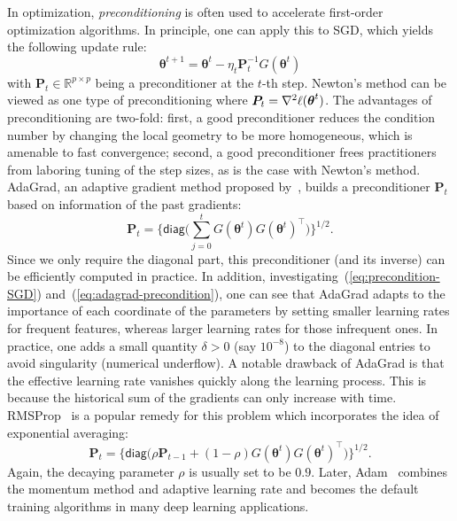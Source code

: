 In optimization, \emph{preconditioning} is often used to accelerate first-order optimization algorithms. In principle, one can apply this to SGD, which yields the following update rule:
\begin{equation}
\bm{\theta}^{t+1}=\bm{\theta}^{t}-\eta_{t}\bm{P}_{t}^{-1}G(\bm{\theta}^{t})\label{eq:precondition-SGD}
\end{equation}
with $\bm{P}_t \in \mathbb{R}^{p\times p}$ being a preconditioner at the $t$-th step. Newton's method can be viewed as one type of preconditioning where $\bm{P}_{t} = \nabla^2 \ell(\text{\boldmath $\theta$}^t)$. The advantages of preconditioning are two-fold: first, a good preconditioner reduces the condition number by changing the local geometry to be more homogeneous, which is amenable to fast convergence; second, a good preconditioner frees practitioners from laboring tuning of the step sizes, as is the case with Newton's method. AdaGrad, an adaptive gradient method proposed by~\cite{duchi2011adaptive}, builds a preconditioner $\bm{P}_{t}$ based on information of the past gradients:
\begin{equation}
\bm{P}_{t}= \Big \{ \mathsf{diag}\Big(\sum_{j=0}^{t}G\left(\bm{\theta}^{t}\right)G
\left(\bm{\theta}^{t}\right)^{\top}\Big) \Big \}^{1/2} \label{eq:adagrad-precondition}.
\end{equation}
Since we only require the diagonal part, this preconditioner (and its inverse) can be efficiently computed in practice. In addition, investigating~(\ref{eq:precondition-SGD}) and~(\ref{eq:adagrad-precondition}), one can see that AdaGrad adapts to the importance
of each coordinate of the parameters by setting smaller learning rates
for frequent features, whereas larger learning rates for those infrequent
ones. In practice, one adds a small quantity $\delta > 0$ (say $10^{-8}$) to the diagonal entries to avoid singularity (numerical underflow). A notable drawback of AdaGrad is that the effective learning rate vanishes quickly along the learning process. This
is because the historical sum of the gradients can only
increase with time. RMSProp~\citep{hinton2012neural} is a popular
remedy for this problem which incorporates the idea of exponential averaging:
\begin{equation}
\bm{P}_{t}= \Big \{ \mathsf{diag}\Big(\rho \bm{P}_{t-1} +
(1-\rho)G\left(\bm{\theta}^{t}\right)G\left(\bm{\theta}^{t}\right)^{\top}
\Big) \Big \}^{1/2} \label{eq:rmsprop-precondition}.
\end{equation}
Again, the decaying parameter $\rho$ is usually set to be $0.9$.
Later, Adam~\citep{kingma2014adam, reddi2018convergence} combines
the momentum method and adaptive learning rate and becomes the default training algorithms in many deep learning applications.

